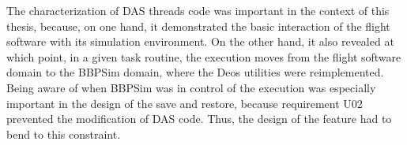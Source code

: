 {The characterization of DAS threads code was important in the context of this thesis, because, on one hand, it demonstrated the basic interaction of the flight software with its simulation environment. On the other hand, it also revealed at which point, in a given task routine, the execution moves from the flight software domain to the BBPSim domain, where the Deos utilities were reimplemented. Being aware of when BBPSim was in control of the execution was especially important in the design of the save and restore, because requirement U02 prevented the modification of DAS code. Thus, the design of the feature had to bend to this constraint.
}